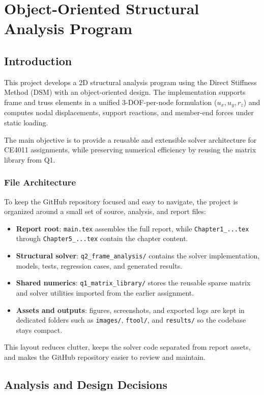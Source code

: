 \chapter{Object-Oriented Structural Analysis Program}

\section{Introduction}
This project develops a 2D structural analysis program using the Direct Stiffness Method (DSM) with an object-oriented design. The implementation supports frame and truss elements in a unified 3-DOF-per-node formulation (\(u_x, u_y, r_z\)) and computes nodal displacements, support reactions, and member-end forces under static loading.

The main objective is to provide a reusable and extensible solver architecture for CE4011 assignments, while preserving numerical efficiency by reusing the matrix library from Q1.

\subsection*{File Architecture}
To keep the GitHub repository focused and easy to navigate, the project is organized around a small set of source, analysis, and report files:
\begin{itemize}
  \item \textbf{Report root}: \texttt{main.tex} assembles the full report, while \texttt{Chapter1\_...tex} through \texttt{Chapter5\_...tex} contain the chapter content.
  \item \textbf{Structural solver}: \texttt{q2\_frame\_analysis/} contains the solver implementation, models, tests, regression cases, and generated results.
  \item \textbf{Shared numerics}: \texttt{q1\_matrix\_library/} stores the reusable sparse matrix and solver utilities imported from the earlier assignment.
  \item \textbf{Assets and outputs}: figures, screenshots, and exported logs are kept in dedicated folders such as \texttt{images/}, \texttt{ftool/}, and \texttt{results/} so the codebase stays compact.
\end{itemize}
This layout reduces clutter, keeps the solver code separated from report assets, and makes the GitHub repository easier to review and maintain.

\section{Analysis and Design Decisions}
